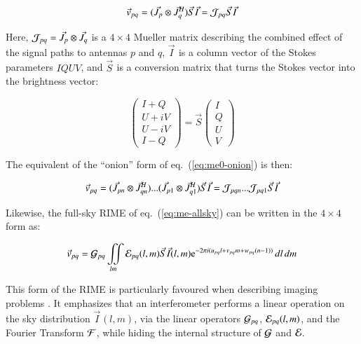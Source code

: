 \documentclass[]{aa}
\newcommand{\herm}{H}
\newcommand{\jones}[2]{\vec {#1}_{#2}}
\newcommand{\jonesT}[2]{\vec {#1}^{\herm}_{#2}}
\begin{document}
    \begin{equation}\label{eq:me:mueller}
    \vec v_{pq} = ( \jones{J}{p} \otimes \jonesT{J}{q} ) \jones{S}{} \jones{I}{} = {\cal J}_{pq} \jones{S}{} \jones{I}{}
    \end{equation}

Here, ${\cal J}_{pq}=\jones{J}{p} \otimes \jones{J}{q}$ is a $4\times4$ Mueller matrix describing the combined effect of the signal paths to antennas $p$ and $q$, $\jones{I}{}$ is a column vector of the Stokes parameters $IQUV$, and $\jones{S}{}$ is a conversion matrix that turns the Stokes vector into the brightness vector:

\[
\left ( \begin{array}{c}
I+Q \\ U+iV \\ U-iV \\ I-Q
\end{array} \right ) 
= \jones{S}{} 
\left ( \begin{array}{c}
I \\ Q \\ U \\ V
\end{array} \right ) 
\]

The equivalent of the ``onion'' form of eq.~(\ref{eq:me0-onion}) is then:

    \begin{equation}\label{eq:me:mueller-onion}
    \vec v_{pq} = ( \jones{J}{pn} \otimes \jonesT{J}{qn} ) ... ( \jones{J}{p1} \otimes \jonesT{J}{q1} ) \jones{S}{} \jones{I}{}
= {\cal J}_{pqn} ...  {\cal J}_{pq1} \jones{S}{} \jones{I}{}
    \end{equation}


Likewise, the full-sky RIME of eq.~(\ref{eq:me-allsky}) can be written in the $4\times4$ form as:

    \begin{equation}\label{eq:allsky:mueller}
\vec v_{pq} = {\cal G}_{pq} \iint\limits_{lm} {\cal E}_{pq}(l,m) \jones{S}{} \jones{I}{}(l,m) {\rm e}^{-2\pi i(u_{pq} l+v_{pq} m+w_{pq} (n-1))} \,dl\,dm 
    \end{equation}

This form of the RIME is particularly favoured when describing imaging problems \citep{SB:imageplane,Rau:DDEs}. It emphasizes that an interferometer performs a linear operation on the sky distribution $\jones{I}{}(l,m)$, via the linear operators ${\cal G}_{pq}$, ${\cal E}_{pq}(l,m)$, and the Fourier Transform $\cal F$, while hiding the internal structure of ${\cal G}$ and ${\cal E}$.
\end{document}
